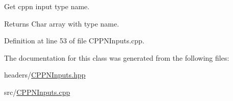 Get cppn input type name. 

\begin{DoxyReturn}{Returns}
Char array with type name. 
\end{DoxyReturn}


Definition at line 53 of file C\-P\-P\-N\-Inputs.\-cpp.



The documentation for this class was generated from the following files\-:\begin{DoxyCompactItemize}
\item 
headers/\hyperlink{_c_p_p_n_inputs_8hpp}{C\-P\-P\-N\-Inputs.\-hpp}\item 
src/\hyperlink{_c_p_p_n_inputs_8cpp}{C\-P\-P\-N\-Inputs.\-cpp}\end{DoxyCompactItemize}
